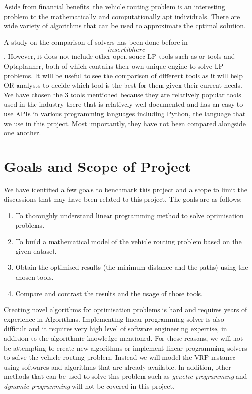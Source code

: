 \documentclass[a4paper, 12pt]{report}
\begin{document}
Aside from financial benefits, the vehicle routing problem is an interesting problem to the mathematically and computationally apt individuals.
There are wide variety of algorithms that can be used to approximate the optimal solution.

A study on the comparison of solvers has been done before in \[inser bib here\]. However, it does not include other open souce LP tools
such as or-tools and Optaplanner, both of which contains their own unique engine to solve LP problems. It will be useful to see the comparison
of different tools as it will help OR analysts to decide which tool is the best for them given their current needs. We have chosen the 3 tools mentioned
because they are relatively popular tools used in the industry there that is relatively well documented and
has an easy to use APIs in various programming languages including Python, the language that we use in this project. Most importantly, they have not
been compared alongside one another.

\section{Goals and Scope of Project}
We have identified a few goals to benchmark this project and a scope to limit the discussions that may have been related to this project. The goals are as
follows:
\begin{enumerate}
\item To thoroughly understand linear programming method to solve optimisation problems.
\item To build a mathematical model of the vehicle routing problem based on the given dataset.
\item Obtain the optimised results (the minimum distance and the paths) using the chosen tools.
\item Compare and contrast the results and the usage of those tools.
\end{enumerate}

Creating novel algorithms for optimisation problems is hard and requires years of experience in Algorithms.
Implementing linear programming solver is also difficult and it requires very high level of software engineering expertise, in addition to
the algorithmic knowledge mentioned. For these reasons, we will not be attempting to create new algorithms or implement linear programming solvers to solve
the vehicle routing problem. Instead we will model the VRP instance using softwares and algorithms that are already available.
In addition, other methods that can be used to solve this problem such as \textit{genetic programming} and \textit{dynamic programming} will
not be covered in this project.
\end{document}
